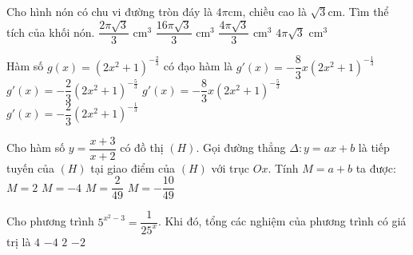 \begin{ex}%
	Cho hình nón có chu vi đường tròn đáy là $4\pi$cm, chiều cao là $\sqrt{3}$cm. Tìm thể tích của khối nón.
	\choice
	{$\dfrac{2\pi \sqrt{3}}{3}\text{ cm}^3$}
	{$\dfrac{16\pi \sqrt{3}}{3}\text{ cm}^3$}
	{\True $\dfrac{4\pi \sqrt{3}}{3}\text{ cm}^3$}
	{$4\pi \sqrt{3}\text{ cm}^3$}
\end{ex}



\begin{ex}%
	Hàm số $g(x)=(2x^2+1)^{-\frac{2}{3}}$ có đạo hàm là
	\choice
	{$g'(x)=-\dfrac{8}{3} x(2x^2+1)^{-\frac{1}{3}}$}
	{$g'(x)=-\dfrac{2}{3} (2x^2+1)^{-\frac{5}{3}}$}
	{\True $g'(x)=-\dfrac{8}{3} x(2x^2+1)^{-\frac{5}{3}}$}
	{$g'(x)=-\dfrac{2}{3} (2x^2+1)^{-\frac{1}{3}}$}
\end{ex}



\begin{ex}%
	Cho hàm số $y=\dfrac{x+3}{x+2}$ có đồ thị $(H)$. Gọi đường thẳng $\Delta: y=ax+b$ là tiếp tuyến của $(H)$ tại giao điểm của $(H)$ với trục $Ox$. Tính $M=a+b$ ta được:
	\choice
	{$M=2$}
	{\True $M=-4$}
	{$M=\dfrac{2}{49}$}
	{$M=-\dfrac{10}{49}$}
\end{ex}



\begin{ex}%
	Cho phương trình $5^{x^2-3}=\dfrac{1}{25^x}$. Khi đó, tổng các nghiệm của phương trình có giá trị là
	\choice
	{$4$}
	{$-4$}
	{\True $2$}
	{$-2$}
\end{ex}



